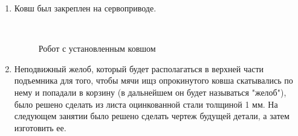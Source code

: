 \begin{enumerate}
\begin{enumerate}
        \item Ковш был закреплен на сервоприводе.
        \begin{figure}[H]
        	\begin{minipage}[h]{0.2\linewidth}
        		\center  
        	\end{minipage}
        	\begin{minipage}[h]{0.6\linewidth}
        		\caption{Робот с установленным ковшом}
        	\end{minipage}
        \end{figure}
		
        \item Неподвижный желоб, который будет располагаться в верхней части подъемника для того, чтобы мячи ищз опрокинутого ковша скатывались по нему  и попадали в корзину (в дальнейшем он будет называться "желоб"), было решено сделать из листа оцинкованной стали толщиной 1 мм. На следующем занятии было решено сделать чертеж будущей детали, а затем изготовить ее.
        

\end{enumerate}
\end{enumerate}

